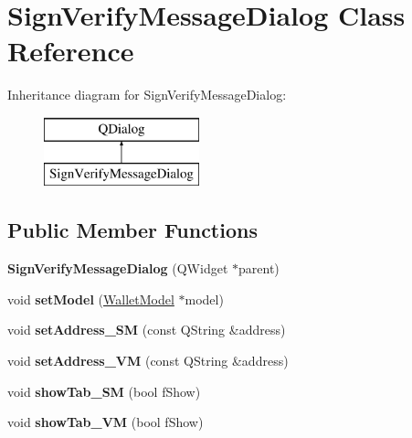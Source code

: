\hypertarget{class_sign_verify_message_dialog}{}\section{Sign\+Verify\+Message\+Dialog Class Reference}
\label{class_sign_verify_message_dialog}
Inheritance diagram for Sign\+Verify\+Message\+Dialog\+:\begin{figure}[H]
\begin{center}
\leavevmode
\includegraphics[height=2.000000cm]{class_sign_verify_message_dialog}
\end{center}
\end{figure}
\subsection*{Public Member Functions}
\begin{DoxyCompactItemize}
\item 
\mbox{\label{class_sign_verify_message_dialog_a04d74fa38e87dc6213237567a6528f28}} 
{\bfseries Sign\+Verify\+Message\+Dialog} (Q\+Widget $\ast$parent)
\item 
\mbox{\label{class_sign_verify_message_dialog_ad1479ca27c2fd7d6fd1160c41660ea84}} 
void {\bfseries set\+Model} (\mbox{\hyperlink{class_wallet_model}{Wallet\+Model}} $\ast$model)
\item 
\mbox{\label{class_sign_verify_message_dialog_a5fc13a7072e3667c91d7e984da09eac2}} 
void {\bfseries set\+Address\+\_\+\+SM} (const Q\+String \&address)
\item 
\mbox{\label{class_sign_verify_message_dialog_af30557fd4bc0aa57940d0f20e34c04ec}} 
void {\bfseries set\+Address\+\_\+\+VM} (const Q\+String \&address)
\item 
\mbox{\label{class_sign_verify_message_dialog_a3b06ea85a2640312e0074d8dabce6416}} 
void {\bfseries show\+Tab\+\_\+\+SM} (bool f\+Show)
\item 
\mbox{\label{class_sign_verify_message_dialog_a6db3c37d3f5a3c070daed2c731cc79d5}} 
void {\bfseries show\+Tab\+\_\+\+VM} (bool f\+Show)
\end{DoxyCompactItemize}
